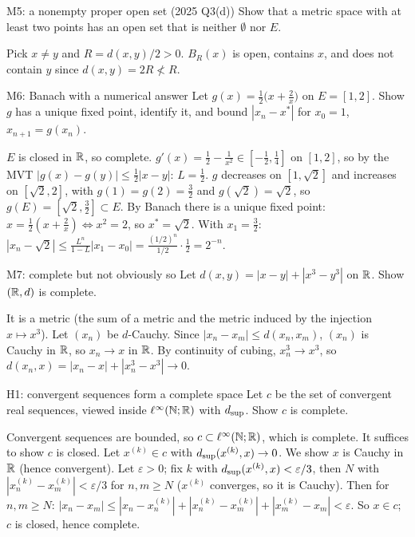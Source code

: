 \begin{exam}{M5: a nonempty proper open set (2025 Q3(d))}
Show that a metric space with at least two points has an open set that is neither $\emptyset$
nor $E$.
\end{exam}
\begin{answer}
Pick $x\ne y$ and $R=d(x,y)/2>0$. $B_R(x)$ is open, contains $x$, and does not contain $y$ since
$d(x,y)=2R\not<R$.
\end{answer}

\begin{exam}{M6: Banach with a numerical answer}
Let $g(x)=\frac12\big(x+\frac2x\big)$ on $E=[1,2]$. Show $g$ has a unique fixed point, identify
it, and bound $|x_n-x^*|$ for $x_0=1$, $x_{n+1}=g(x_n)$.
\end{exam}
\begin{answer}
$E$ is closed in $\mathbb R$, so complete. $g'(x)=\frac12-\frac1{x^2}\in[-\frac12,\frac14]$ on $[1,2]$, so
by the MVT $|g(x)-g(y)|\le\frac12|x-y|$: $L=\frac12$. $g$ decreases on $[1,\sqrt2]$ and increases
on $[\sqrt2,2]$, with $g(1)=g(2)=\frac32$ and $g(\sqrt2)=\sqrt2$, so $g(E)=[\sqrt2,\frac32]\subset
E$. By Banach there is a unique fixed point: $x=\frac12(x+\frac2x)\iff x^2=2$, so $x^*=\sqrt2$.
With $x_1=\frac32$: $|x_n-\sqrt2|\le\frac{L^n}{1-L}|x_1-x_0|=\frac{(1/2)^n}{1/2}\cdot\frac12=2^{-n}$.
\end{answer}

\begin{exam}{M7: complete but not obviously so}
Let $d(x,y)=|x-y|+|x^3-y^3|$ on $\mathbb R$. Show $(\mathbb R,d)$ is complete.
\end{exam}
\begin{answer}
It is a metric (the sum of a metric and the metric induced by the injection $x\mapsto x^3$). Let
$(x_n)$ be $d$-Cauchy. Since $|x_n-x_m|\le d(x_n,x_m)$, $(x_n)$ is Cauchy in $\mathbb R$, so $x_n\to x$
in $\mathbb R$. By continuity of cubing, $x_n^3\to x^3$, so $d(x_n,x)=|x_n-x|+|x_n^3-x^3|\to0$.
\end{answer}


\begin{exam}{H1: convergent sequences form a complete space}
Let $c$ be the set of convergent real sequences, viewed inside $\ell^\infty(\mathbb N;\mathbb R)$ with
$d_{\sup}$. Show $c$ is complete.
\end{exam}
\begin{answer}
Convergent sequences are bounded, so $c\subset\ell^\infty(\mathbb N;\mathbb R)$, which is complete. It
suffices to show $c$ is closed. Let $x^{(k)}\in c$ with $d_{\sup}(x^{(k)},x)\to0$. We show $x$ is
Cauchy in $\mathbb R$ (hence convergent). Let $\varepsilon>0$; fix $k$ with $d_{\sup}(x^{(k)},x)<
\varepsilon/3$, then $N$ with $|x^{(k)}_n-x^{(k)}_m|<\varepsilon/3$ for $n,m\ge N$ ($x^{(k)}$
converges, so it is Cauchy). Then for $n,m\ge N$:
$|x_n-x_m|\le|x_n-x^{(k)}_n|+|x^{(k)}_n-x^{(k)}_m|+|x^{(k)}_m-x_m|<\varepsilon$.
So $x\in c$; $c$ is closed, hence complete.
\end{answer}

